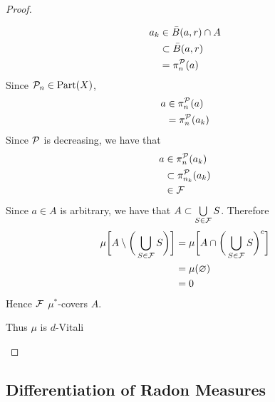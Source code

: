 \documentclass{book}
\begin{document}
\begin{proof}
\begin{itemize}
\begin{enumerate}
				\begin{align*}
					a_k 
					& \in \bar{B}(a, r) \cap A \\
					& \subset \bar{B}(a, r) \\
					& = \pi^{\mathcal{P}}_n(a)
				\end{align*}
				Since $\mathcal{P}_n \in \operatorname*{\text{Part}}(X)$, 
				\begin{align*}
					a
					& \in \pi^{\mathcal{P}}_n(a) \\
					& = \pi^{\mathcal{P}}_n(a_k) \\
				\end{align*}
				Since $\mathcal{P}$ is decreasing, we have that 
				\begin{align*}
					a
					& \in \pi^{\mathcal{P}}_n(a_k) \\
					& \subset \pi^{\mathcal{P}}_{n_k}(a_k) \\
					& \in \mathcal{F} 
				\end{align*}
				Since $a \in A$ is arbitrary, we have that $A \subset \bigcup\limits_{S \in \mathcal{F}}S$. Therefore 
				\begin{align*}
					\mu \bigg[ A \setminus \bigg(\bigcup_{S \in \mathcal{F}}S \bigg) \bigg] 
					& = \mu \bigg[ A \cap \bigg(\bigcup_{S \in \mathcal{F}}S \bigg)^c \bigg] \\ 
					& = \mu(\varnothing) \\
					& = 0
				\end{align*}
				Hence $\mathcal{F}$ $\mu^*$-covers $A$. 
			\end{enumerate}
			Thus $\mu$ is $d$-Vitali
		\end{itemize}
	\end{proof}

	
	
	
	
	
	
	
	
	
	
	
	
	
	
	
	
	
	
	
	
	
	
	
	
	
	
	
	
	
	\subsection{Differentiation of Radon Measures}
\end{document}
